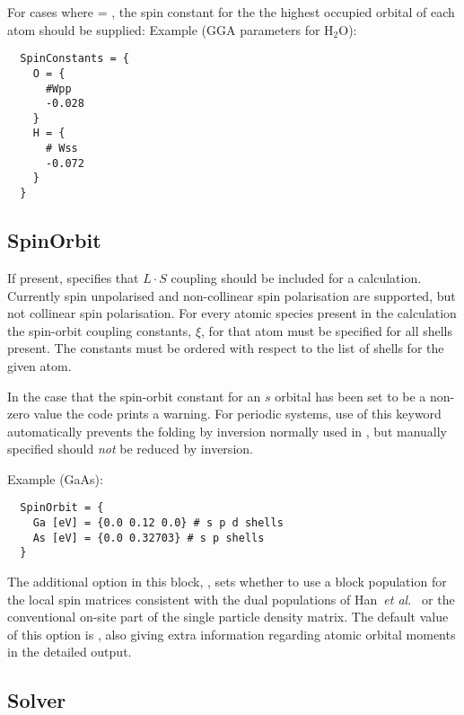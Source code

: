For cases where  = , the spin constant for the the
highest occupied orbital of each atom should be supplied: Example (GGA parameters
for H$_2$O):
\begin{verbatim}
  SpinConstants = {
    O = {
      #Wpp
      -0.028
    }
    H = {
      # Wss
      -0.072
    }
  }
\end{verbatim}

\subsection{SpinOrbit}
\label{sec:dftbp.SpinOrbit}

If present, specifies that $L \cdot S$ coupling should be included for
a calculation. Currently spin unpolarised and non-collinear spin
polarisation are supported, but not collinear spin polarisation. For
every atomic species present in the calculation the spin-orbit
coupling constants, $\xi$, for that atom must be specified for all
shells present.  The constants must be ordered with respect to the
list of shells for the given atom.

In the case that the spin-orbit constant for an $s$ orbital has been
set to be a non-zero value the code prints a warning. For periodic
systems, use of this keyword automatically prevents the folding by
inversion normally used in , but manually
specified  should {\em not} be reduced by
inversion.

Example (GaAs):
\begin{verbatim}
  SpinOrbit = {
    Ga [eV] = {0.0 0.12 0.0} # s p d shells
    As [eV] = {0.0 0.32703} # s p shells
  }
\end{verbatim}

The additional option in this block, , sets whether to use a block
population for the local spin matrices consistent with the dual populations of
Han~{\it et al.}~\cite{han-PRB-73-045110} or the conventional on-site part of
the single particle density matrix. The default value of this option is
, also giving extra information regarding atomic orbital moments in the
detailed output.

\subsection{Solver}
\label{sec:dftbp.Solver}

